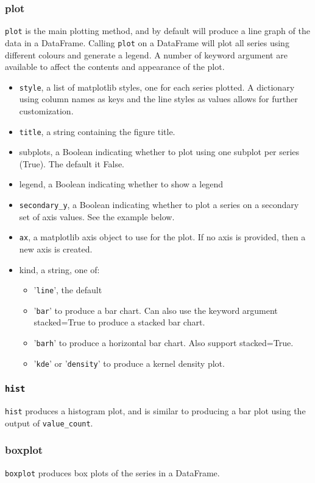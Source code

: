 \documentclass[KSmain.tex]{subfiles}
\begin{document}
	\subsubsection*{plot}
	\texttt{plot} is the main plotting method, and by default will produce a line graph of the data in a DataFrame.
	Calling \texttt{plot} on a DataFrame will plot all series using different colours and generate a legend. A number of
	keyword argument are available to affect the contents and appearance of the plot.
	\begin{itemize}
		\item \texttt{style}, a list of matplotlib styles, one for each series plotted. A dictionary using column names as
		keys and the line styles as values allows for further customization.
		\item \texttt{title}, a string containing the figure title.
		\item subplots, a Boolean indicating whether to plot using one subplot per series (True). The default it
		False.
		\item legend, a Boolean indicating whether to show a legend
		\item \texttt{secondary\_y}, a Boolean indicating whether to plot a series on a secondary set of axis values. See the
		example below.
		\item \texttt{ax}, a matplotlib axis object to use for the plot. If no axis is provided, then a new axis is created.
		\item kind, a string, one of:
		\begin{itemize}
			\item ’\texttt{line}’, the default
			\item ’\texttt{bar}’ to produce a bar chart. Can also use the keyword argument stacked=True to produce a
			stacked bar chart.
			\item ’\texttt{barh}’ to produce a horizontal bar chart. Also support stacked=True.
			\item ’\texttt{kde}’ or ’\texttt{density}’ to produce a kernel density plot.
		\end{itemize}
	\end{itemize}
	\subsubsection{\texttt{hist}}
	\texttt{hist} produces a histogram plot, and is similar to producing a bar plot using the output of \texttt{value\_count}.
	
	\subsubsection{boxplot}
	\texttt{boxplot} produces box plots of the series in a DataFrame.
\end{document}
